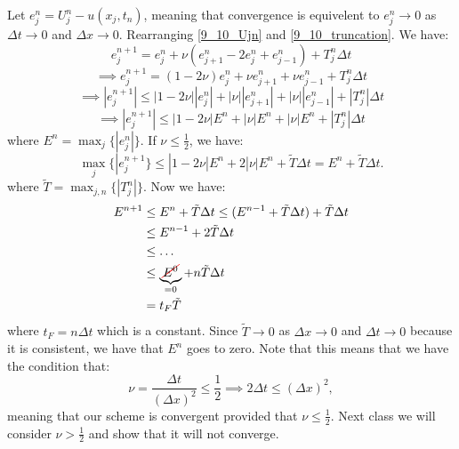 \documentclass[../main/main.tex]{subfiles}
\begin{document}
Let $e_j^n = U_j^n - u(x_j,t_n)$, meaning that convergence is equivelent to $e_j^{n} \to  0 $ as $\Delta t \to  0$ and $\Delta x \to  0$. Rearranging \ref{9_10_Ujn} and \ref{9_10_truncation}.
We have: \[
    e_j^{n+1} = e_j^n + \nu \left( e_{j+1}^n - 2 e_j^n + e_{j-1}^n \right) + T_j^n \Delta t 
\] \[
\implies e_j^{n+1} = (1-2\nu)e_j^n + \nu e_{j+1}^n + \nu e_{j-1}^n + T_j^n \Delta t
\] \[
\implies |e_j^{n+1}| \le  |1-2\nu| |e_j^n| + |\nu| |e_{j+1}^{n}| + |\nu | | e_{j-1}^n| + |T^n_j| \Delta t 
\] 
\[
    \implies |e_j^{n+1}| \le 
|1-2\nu| E^n + |\nu| E^n + |\nu | E^n + |T^n_j| \Delta t 
\] 
where $ E^n = \max_j \{|e_j^n|\} .$ If $\nu\le \frac{1}{2}$, we have: \[
    \max_j \{|e^{n+1}_j\} \le  |1-2\nu| E^{n} + 2|\nu| E^{n} + \tilde{T} \Delta t = E^{n} + \tilde{T} \Delta t
.\] where $\tilde{T} = \max _{j, n} \{|T_j^n|\} $. Now we have:
\begin{align*}
    E^{n+1} &\le  E^n + \tilde{T} \Delta t \le  (E^{n-1} + \tilde{T} \Delta t) + \tilde{T} \Delta t   \\
            &\le  E^{n-1} + 2 \tilde{T} \Delta t \\
            &\le \ldots\\
            &\le  \underbrace{\Ccancel[red]{E^0}}_{=0} + n \tilde{T} \Delta t\\
            &= t_F\tilde{T} 
\end{align*}
where $t_F=n \Delta t$ which is a constant.
Since $\tilde{T} \to  0$ as $\Delta x\to  0$ and $\Delta t \to  0$ because it is consistent, we have that $E^{n}$ goes to zero.  Note that this means that we have the condition that: \[
    \nu = \frac{\Delta t}{(\Delta x)^2} \le  \frac{1}{2} \implies 2\Delta t \le (\Delta x)^2
,\] meaning that our scheme is convergent provided that $\nu \le  \frac{1}{2}$. Next class we will consider $\nu > \frac{1}{2}$ and show that it will not converge.
\end{document}
